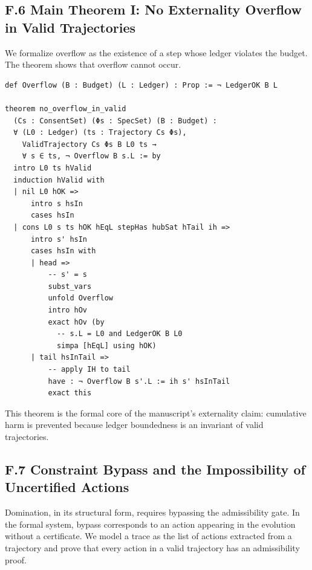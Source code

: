 \documentclass[11pt,oneside]{article}
\begin{document}
\subsection{F.6 Main Theorem I: No Externality Overflow in Valid Trajectories}

We formalize overflow as the existence of a step whose ledger violates the budget. The theorem shows that overflow cannot occur.

\begin{verbatim}
def Overflow (B : Budget) (L : Ledger) : Prop := ¬ LedgerOK B L

theorem no_overflow_in_valid
  (Cs : ConsentSet) (Φs : SpecSet) (B : Budget) :
  ∀ (L0 : Ledger) (ts : Trajectory Cs Φs),
    ValidTrajectory Cs Φs B L0 ts →
    ∀ s ∈ ts, ¬ Overflow B s.L := by
  intro L0 ts hValid
  induction hValid with
  | nil L0 hOK =>
      intro s hsIn
      cases hsIn
  | cons L0 s ts hOK hEqL stepHas hubSat hTail ih =>
      intro s' hsIn
      cases hsIn with
      | head =>
          -- s' = s
          subst_vars
          unfold Overflow
          intro hOv
          exact hOv (by
            -- s.L = L0 and LedgerOK B L0
            simpa [hEqL] using hOK)
      | tail hsInTail =>
          -- apply IH to tail
          have : ¬ Overflow B s'.L := ih s' hsInTail
          exact this
\end{verbatim}

This theorem is the formal core of the manuscript’s externality claim: cumulative harm is prevented because ledger boundedness is an invariant of valid trajectories.

\subsection{F.7 Constraint Bypass and the Impossibility of Uncertified Actions}

Domination, in its structural form, requires bypassing the admissibility gate. In the formal system, bypass corresponds to an action appearing in the evolution without a certificate. We model a trace as the list of actions extracted from a trajectory and prove that every action in a valid trajectory has an admissibility proof.
\end{document}
